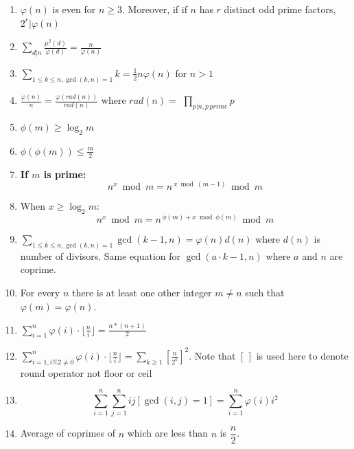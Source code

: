 \begin{enumerate}[resume]
    \item $\displaystyle \varphi(n)$ is even for $n\geq3$. Moreover, if if $n$ has $r$ distinct odd prime factors, $\displaystyle 2^r \vert \varphi(n)$
    \item $\displaystyle \sum\limits_{d\vert{n}}^{} \frac{\mu^2(d)}{\varphi(d)}=\frac{n}{\varphi(n)}$
    \item $\displaystyle \sum\limits_{1\leq k \leq n, \gcd(k, n)=1}k=\frac{1}{2}n\varphi(n)$ for $n > 1$
    \item $\displaystyle \frac{\varphi(n)}{n}=\frac{\varphi(rad(n))}{rad(n)}$ where $rad(n)=$
          $\displaystyle \prod\limits_{p\vert n, p \, prime} p$
    \item $\displaystyle \phi(m) \geq \log_2{m}$
    \item $\displaystyle \phi(\phi(m))\leq\frac{m}{2}$
    \item \textbf{If $m$ is prime:}
          \[
              n^x \bmod m = n^{\,x \bmod (m-1)} \bmod m
          \]

    \item When $\displaystyle x \ge \log_2 m$:
          \[
              n^x \bmod m = n^{\,\phi(m) + x \bmod \phi(m)} \bmod m
          \]
    \item $\displaystyle \sum\limits_{1\leq k\leq n, \gcd(k, n)=1}\gcd(k-1, n)=\varphi(n)d(n)$ where $d(n)$ is number of divisors. Same equation for $\displaystyle \gcd(a \cdot k-1, n)$ where $\displaystyle a$ and $n$ are coprime.
    \item For every $n$ there is at least one other integer $m\ne n$ such that $\displaystyle \varphi(m)=\varphi(n).$
    \item $\displaystyle \sum\limits_{i=1}^{n} {\varphi(i) \cdot \lfloor\frac{n}{i}\rfloor=\frac{n*(n+1)}{2}}$
    \item $\displaystyle \sum\limits_{i=1, i \% 2 \ne 0 }^{n} \varphi(i) \cdot \lfloor\frac{n}{i}\rfloor=\sum\limits_{k\geq 1}[\frac{n}{2^k}]^2$.
          Note that $[\, ]$ is used here to denote round operator not floor or ceil
    \item \[\displaystyle \sum\limits_{i=1}^{n}\sum\limits_{j=1}^{n}ij[\gcd(i, j)=1]=\sum\limits_{i=1}^{n}\varphi(i)i^2\]
    \item Average of coprimes of $n$ which are less than $n$ is $\displaystyle \dfrac{n}{2}$.
\end{enumerate}
